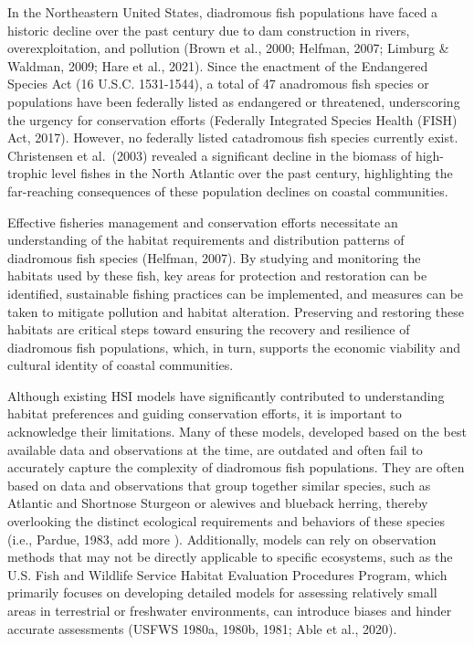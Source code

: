 \documentclass[
]{book}
\begin{document}
In the Northeastern United States, diadromous fish populations have faced a historic decline over the past century due to dam construction in rivers, overexploitation, and pollution (Brown et al., 2000; Helfman, 2007; Limburg \& Waldman, 2009; Hare et al., 2021). Since the enactment of the Endangered Species Act (16 U.S.C. 1531-1544), a total of 47 anadromous fish species or populations have been federally listed as endangered or threatened, underscoring the urgency for conservation efforts (Federally Integrated Species Health (FISH) Act, 2017). However, no federally listed catadromous fish species currently exist. Christensen et al.~(2003) revealed a significant decline in the biomass of high-trophic level fishes in the North Atlantic over the past century, highlighting the far-reaching consequences of these population declines on coastal communities.

Effective fisheries management and conservation efforts necessitate an understanding of the habitat requirements and distribution patterns of diadromous fish species (Helfman, 2007). By studying and monitoring the habitats used by these fish, key areas for protection and restoration can be identified, sustainable fishing practices can be implemented, and measures can be taken to mitigate pollution and habitat alteration. Preserving and restoring these habitats are critical steps toward ensuring the recovery and resilience of diadromous fish populations, which, in turn, supports the economic viability and cultural identity of coastal communities.

Although existing HSI models have significantly contributed to understanding habitat preferences and guiding conservation efforts, it is important to acknowledge their limitations. Many of these models, developed based on the best available data and observations at the time, are outdated and often fail to accurately capture the complexity of diadromous fish populations. They are often based on data and observations that group together similar species, such as Atlantic and Shortnose Sturgeon or alewives and blueback herring, thereby overlooking the distinct ecological requirements and behaviors of these species (i.e., Pardue, 1983, add more ). Additionally, models can rely on observation methods that may not be directly applicable to specific ecosystems, such as the U.S. Fish and Wildlife Service Habitat Evaluation Procedures Program, which primarily focuses on developing detailed models for assessing relatively small areas in terrestrial or freshwater environments, can introduce biases and hinder accurate assessments (USFWS 1980a, 1980b, 1981; Able et al., 2020).
\end{document}
